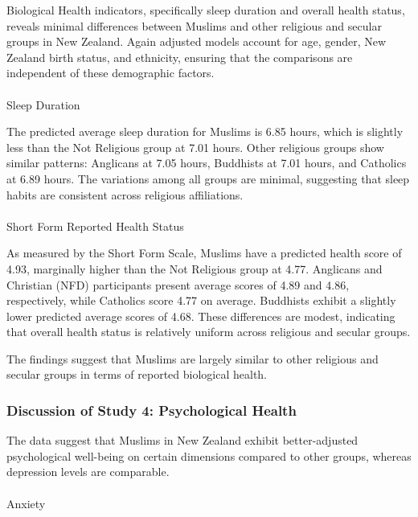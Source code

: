 \documentclass[
  single column]{article}
\makeatletter
\let\oldparagraph\paragraph
\renewcommand{\paragraph}{
    \@ifstar
      \xxxParagraphStar
      \xxxParagraphNoStar
  }
\newcommand{\xxxParagraphStar}[1]{\oldparagraph*{#1}\mbox{}}
\newcommand{\xxxParagraphNoStar}[1]{\oldparagraph{#1}\mbox{}}
\makeatother
\begin{document}
Biological Health indicators, specifically sleep duration and overall
health status, reveals minimal differences between Muslims and other
religious and secular groups in New Zealand. Again adjusted models
account for age, gender, New Zealand birth status, and ethnicity,
ensuring that the comparisons are independent of these demographic
factors.

\paragraph{Sleep Duration}\label{sleep-duration}

The predicted average sleep duration for Muslims is 6.85 hours, which is
slightly less than the Not Religious group at 7.01 hours. Other
religious groups show similar patterns: Anglicans at 7.05 hours,
Buddhists at 7.01 hours, and Catholics at 6.89 hours. The variations
among all groups are minimal, suggesting that sleep habits are
consistent across religious affiliations.

\paragraph{Short Form Reported Health
Status}\label{short-form-reported-health-status}

As measured by the Short Form Scale, Muslims have a predicted health
score of 4.93, marginally higher than the Not Religious group at 4.77.
Anglicans and Christian (NFD) participants present average scores of
4.89 and 4.86, respectively, while Catholics score 4.77 on average.
Buddhists exhibit a slightly lower predicted average scores of 4.68.
These differences are modest, indicating that overall health status is
relatively uniform across religious and secular groups.

The findings suggest that Muslims are largely similar to other religious
and secular groups in terms of reported biological health.

\subsubsection{Discussion of Study 4: Psychological
Health}\label{discussion-of-study-4-psychological-health}

The data suggest that Muslims in New Zealand exhibit better-adjusted
psychological well-being on certain dimensions compared to other groups,
whereas depression levels are comparable.

\paragraph{Anxiety}\label{anxiety}
\end{document}
